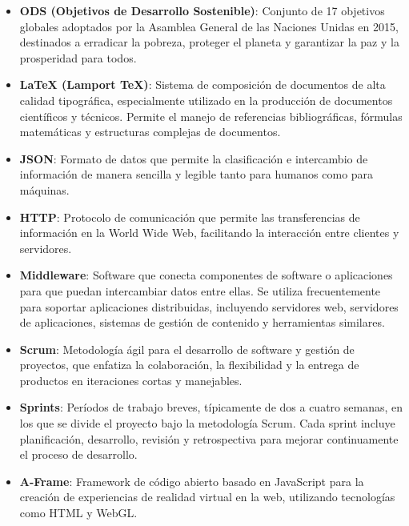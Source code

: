 \documentclass[a4paper, 12pt]{book}
\begin{document}
\begin{itemize}

    \item \textbf{ODS (Objetivos de Desarrollo Sostenible)}: Conjunto de 17 objetivos globales adoptados por la Asamblea General de las Naciones Unidas en 2015, destinados a erradicar la pobreza, proteger el planeta y garantizar la paz y la prosperidad para todos.

    \item \textbf{LaTeX (Lamport TeX)}: Sistema de composición de documentos de alta calidad tipográfica, especialmente utilizado en la producción de documentos científicos y técnicos. Permite el manejo de referencias bibliográficas, fórmulas matemáticas y estructuras complejas de documentos.

    \item \textbf{JSON}: Formato de datos que permite la clasificación e intercambio de información de manera sencilla y legible tanto para humanos como para máquinas.
    
    \item \textbf{HTTP}: Protocolo de comunicación que permite las transferencias de información en la World Wide Web, facilitando la interacción entre clientes y servidores.

    \item \textbf{Middleware}: Software que conecta componentes de software o aplicaciones para que puedan intercambiar datos entre ellas. Se utiliza frecuentemente para soportar aplicaciones distribuidas, incluyendo servidores web, servidores de aplicaciones, sistemas de gestión de contenido y herramientas similares.

    \item \textbf{Scrum}: Metodología ágil para el desarrollo de software y gestión de proyectos, que enfatiza la colaboración, la flexibilidad y la entrega de productos en iteraciones cortas y manejables.

    \item \textbf{Sprints}: Períodos de trabajo breves, típicamente de dos a cuatro semanas, en los que se divide el proyecto bajo la metodología Scrum. Cada sprint incluye planificación, desarrollo, revisión y retrospectiva para mejorar continuamente el proceso de desarrollo.

    \item \textbf{A-Frame}: Framework de código abierto basado en JavaScript para la creación de experiencias de realidad virtual en la web, utilizando tecnologías como HTML y WebGL.


\end{itemize}
\end{document}
